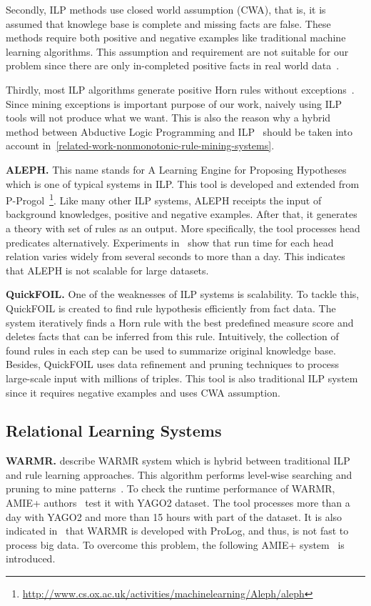 Secondly, ILP methods use closed world assumption (CWA), that is, it is assumed that knowlege base is complete and missing facts are false. These methods require both positive and negative examples like traditional machine learning algorithms. This assumption and requirement are not suitable for our problem since there are only in-completed positive facts in real world data~\cite{ref10}.

Thirdly, most ILP algorithms generate positive Horn rules without exceptions~\cite{ref11}. Since mining exceptions is important purpose of our work, naively using ILP tools will not produce what we want. This is also the reason why a hybrid method between Abductive Logic Programming and ILP~\cite{ref11} should be taken into account in~\ref{related-work-nonmonotonic-rule-mining-systems}.

\textbf{ALEPH.} This name stands for A Learning Engine for Proposing Hypotheses which is one of typical systems in ILP. This tool is developed and extended from P-Progol~\footnote{\url{http://www.cs.ox.ac.uk/activities/machinelearning/Aleph/aleph}}. Like many other ILP systems, ALEPH receipts the input of background knowledges, positive and negative examples. After that, it generates a theory with set of rules as an output. More specifically, the tool processes head predicates alternatively. Experiments in~\cite{ref10} show that run time for each head relation varies widely from several seconds to more than a day. This indicates that ALEPH is not scalable for large datasets.

\textbf{QuickFOIL.} One of the weaknesses of ILP systems is scalability. To tackle this, QuickFOIL is created to find rule hypothesis efficiently from fact data. The system iteratively finds a Horn rule with the best predefined measure score and deletes facts that can be inferred from this rule. Intuitively, the collection of found rules in each step can be used to summarize original knowledge base. Besides, QuickFOIL uses data refinement and pruning techniques to process large-scale input with millions of triples. This tool is also traditional ILP system since it requires negative examples and uses CWA assumption.

\subsection{Relational Learning Systems}

\textbf{WARMR.} \cite{ref16, ref17} describe WARMR system which is hybrid between traditional ILP and rule learning approaches. This algorithm performs level-wise searching and pruning to mine patterns~\cite{ref10}. To check the runtime performance of WARMR, AMIE+ authors~\cite{ref10} test it with YAGO2 dataset. The tool processes more than a day with YAGO2 and more than 15 hours with part of the dataset. It is also indicated in~\cite{ref10} that WARMR is developed with ProLog, and thus, is not fast to process big data. To overcome this problem, the following AMIE+ system~\cite{ref10} is introduced.

